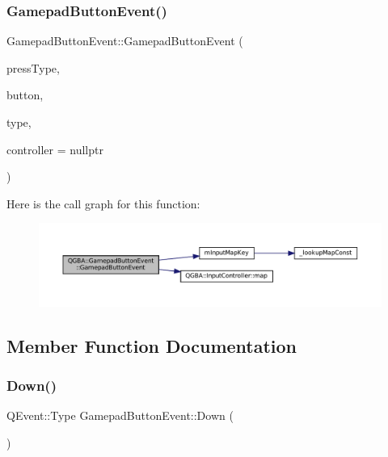\subsubsection{\texorpdfstring{Gamepad\+Button\+Event()}{GamepadButtonEvent()}}
{\footnotesize\ttfamily Gamepad\+Button\+Event\+::\+Gamepad\+Button\+Event (\begin{DoxyParamCaption}\item[{Type}]{press\+Type,  }\item[{\mbox{\hyperlink{ioapi_8h_a787fa3cf048117ba7123753c1e74fcd6}{int}}}]{button,  }\item[{\mbox{\hyperlink{ioapi_8h_a787fa3cf048117ba7123753c1e74fcd6}{int}}}]{type,  }\item[{\mbox{\hyperlink{class_q_g_b_a_1_1_input_controller}{Input\+Controller}} $\ast$}]{controller = {\ttfamily nullptr} }\end{DoxyParamCaption})}

Here is the call graph for this function\+:
\nopagebreak
\begin{figure}[H]
\begin{center}
\leavevmode
\includegraphics[width=350pt]{class_q_g_b_a_1_1_gamepad_button_event_a5bc5f573023d767128bea16fc9284d41_cgraph}
\end{center}
\end{figure}


\subsection{Member Function Documentation}
\mbox{\label{class_q_g_b_a_1_1_gamepad_button_event_a95c6ffc6201926bd3f3feba985dcf2ec}} 
\subsubsection{\texorpdfstring{Down()}{Down()}}
{\footnotesize\ttfamily Q\+Event\+::\+Type Gamepad\+Button\+Event\+::\+Down (\begin{DoxyParamCaption}{ }\end{DoxyParamCaption})\hspace{0.3cm}{\ttfamily [static]}}

